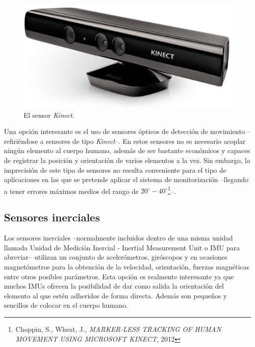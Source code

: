 \documentclass[12pt, a4paper]{report}
\begin{document}
\begin{figure}
  \begin{center}
    \includegraphics[scale=0.2]{../img/kinect.png} 
  \end{center}
  \caption[El sensor Kinect]{El sensor \textit{Kinect}.}
  \label{fig: kinect}
\end{figure}

Una opción interesante es el uso de sensores ópticos de detección de movimiento --refiriéndose a sensores de tipo \textit{Kinect}--. En estos sensores no es necesario acoplar ningún elemento al cuerpo humano, además de ser bastante económicos y capaces de registrar la posición y orientación de varios elementos a la vez. Sin embargo, la imprecisión de este tipo de sensores no resulta conveniente para el tipo de aplicaciones en las que se pretende aplicar el sistema de monitorización --llegando a tener errores máximos medios del rango de $20^\circ-40^\circ$\footnote{Choppin, S., Wheat, J.,
\textit{MARKER-LESS TRACKING OF HUMAN MOVEMENT USING MICROSOFT
KINECT}, 2012}--.\\

\subsection{Sensores inerciales}

Los sensores inerciales --normalmente incluidos dentro de una misma unidad llamada Unidad de Medición Inercial - Inertial Measurement Unit o IMU para abreviar-- utilizan un conjunto de acelerómetros, giróscopos y en ocasiones magnetómetros para la obtención de la velocidad, orientación, fuerzas magnéticas entre otros posibles parámetros. Esta opción es realmente interesante ya que muchos IMUs ofrecen la posibilidad de dar como salida la orientación del elemento al que estén adheridos de forma directa. Además son pequeños y sencillos de colocar en el cuerpo humano. \\
\end{document}
